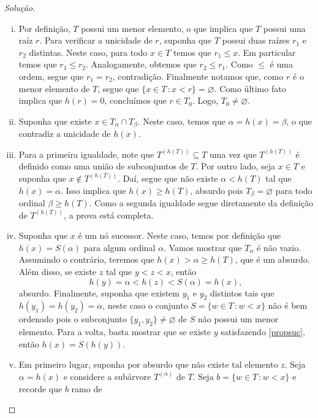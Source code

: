 \documentclass[a4paper]{article}
\begin{document}
\begin{proof}[Solução]\hfill
  \begin{enumerate}[(i)]
  \item Por definição, \(T\) possui um menor
    elemento, o que implica que \(T\) possui uma raíz \(r\). Para verificar a
    unicidade de \(r\), suponha que \(T\) possui duas raízes \(r_1\) e \(r_2\)
    distintas. Neste caso,  para todo \(x\in T\) temos que
    \(r_1\leq x\). Em particular temos que
    \(r_1\leq r_2\). Analogamente, obtemos que \(r_2\leq r_1\). Como \(\leq\) é
    uma ordem, segue que \(r_1=r_2\), contradição. Finalmente notamos que,
    como \(r\) é o menor elemento de \(T\), segue que \(\{x\in T\,\colon
    x<r\}=\varnothing\). Como último fato implica que \(h(r)=0\), concluímos que
    \(r\in T_0\). Logo, \(T_0\not=\varnothing\).
  \item Suponha que existe \(x\in T_\alpha\cap T_\beta\). Neste caso, temos que
    \(\alpha=h(x)=\beta\), o que contradiz a unicidade de \(h(x)\).
  \item Para a primeira igualdade, note que \(T^{(h(T))}\subseteq T\) uma vez
    que \(T^{(h(T))}\) é definido como uma união de subconjuntos de \(T\). Por
    outro lado, seja \(x\in T\) e suponha que \(x\not\in T^{(h(T))}\). Daí,
    segue que não existe \(\alpha < h(T)\) tal que \(h(x)=\alpha\). Isso implica
    que \(h(x)\geq h(T)\), absurdo pois \(T_\beta=\varnothing\) para todo
    ordinal \(\beta \geq h(T)\). Como a segunda igualdade segue diretamente da
    definição de \(T^{(h(T))}\), a prova está completa. 
  \item Suponha que \(x\) é um nó sucessor. Neste caso, temos por definição
    que \(h(x)=S(\alpha)\) para algum ordinal \(\alpha\). Vamos mostrar que
    \(T_\alpha\) é não vazio. Assumindo o contrário, teremos que
    \(h(x)>\alpha\geq h(T)\), que é um absurdo. Além disso,
    se  existe \(z\) tal que \(y<z<x\), então
    \[h(y)=\alpha<h(z)<S(\alpha)=h(x),\] absurdo. Finalmente, suponha que
    existem \(y_1\)
    e \(y_2\) distintos tais que \(h(y_1)=h(y_2)=\alpha\), neste caso o conjunto \(S=\{w\in
    T\,\colon w <x\}\) não é bem ordenado pois o subconjunto
    \(\{y_1,y_2\}\not = \varnothing\) de \(S\) não possui um menor elemento.
    Para a volta, basta mostrar que se existe \(y\) satisfazendo
    \eqref{propsuc}, então \(h(x)=S(h(y))\).
  \item Em primeiro lugar, suponha por absurdo que não existe tal elemento
    \(z\). Seja \(\alpha=h(x)\) e considere a subárvore \(T^{(\alpha)}\) de \(T\).
    Seja \(b=\{w \in T \,\colon w<x\}\) e recorde que \(b\) ramo de

\end{enumerate}
\end{proof}
\end{document}

